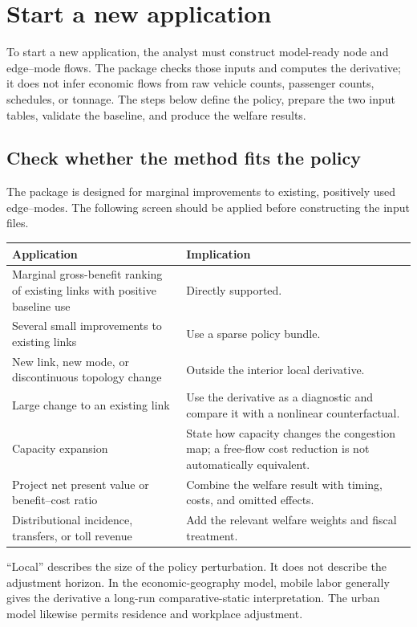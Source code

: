 \section{Start a new application}
\label{ch:quickstart}
\label{sec:own-data-workflow}

To start a new application, the analyst must construct model-ready node and
edge--mode flows. The package checks those inputs and computes the derivative;
it does not infer economic flows from raw vehicle counts, passenger counts,
schedules, or tonnage. The steps below define the policy, prepare the two input
tables, validate the baseline, and produce the welfare results.

\subsection{Check whether the method fits the policy}

The package is designed for marginal improvements to existing, positively
used edge--modes. The following screen should be applied before constructing
the input files.
\begin{longtable}{L{0.56\textwidth}L{0.36\textwidth}}
\toprule
Application & Implication \\
\midrule
\endhead
Marginal gross-benefit ranking of existing links with positive baseline use &
Directly supported. \\
Several small improvements to existing links &
Use a sparse policy bundle. \\
New link, new mode, or discontinuous topology change &
Outside the interior local derivative. \\
Large change to an existing link &
Use the derivative as a diagnostic and compare it with a nonlinear
counterfactual. \\
Capacity expansion &
State how capacity changes the congestion map; a free-flow cost reduction is
not automatically equivalent. \\
Project net present value or benefit--cost ratio &
Combine the welfare result with timing, costs, and omitted effects. \\
Distributional incidence, transfers, or toll revenue &
Add the relevant welfare weights and fiscal treatment. \\
\bottomrule
\end{longtable}

``Local'' describes the size of the policy perturbation. It does not describe
the adjustment horizon. In the economic-geography model, mobile labor
generally gives the derivative a long-run comparative-static interpretation.
The urban model likewise permits residence and workplace adjustment.

